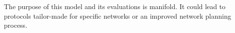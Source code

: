 The purpose of this model and its evaluations is manifold. It could lead to protocols tailor-made for specific networks or an improved network planning process.








  


  






  

    
  
  
